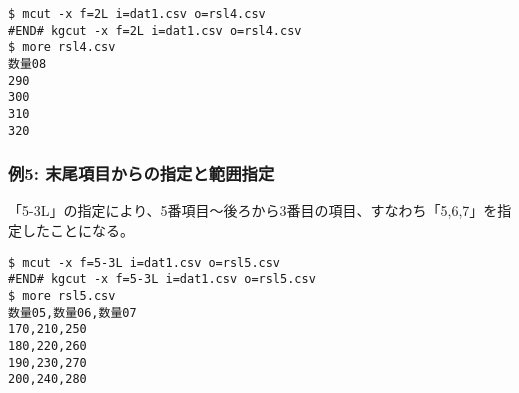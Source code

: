 \begin{Verbatim}[baselinestretch=0.7,frame=single]
$ mcut -x f=2L i=dat1.csv o=rsl4.csv
#END# kgcut -x f=2L i=dat1.csv o=rsl4.csv
$ more rsl4.csv
数量08
290
300
310
320
\end{Verbatim}
\subsubsection*{例5: 末尾項目からの指定と範囲指定}

「5-3L」の指定により、5番項目～後ろから3番目の項目、すなわち「5,6,7」を指定したことになる。


\begin{Verbatim}[baselinestretch=0.7,frame=single]
$ mcut -x f=5-3L i=dat1.csv o=rsl5.csv
#END# kgcut -x f=5-3L i=dat1.csv o=rsl5.csv
$ more rsl5.csv
数量05,数量06,数量07
170,210,250
180,220,260
190,230,270
200,240,280
\end{Verbatim}
